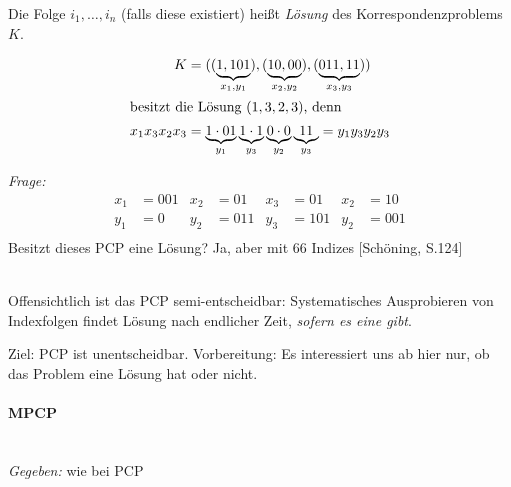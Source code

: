 Die Folge $i_1, \dots, i_n$ (falls diese existiert) heißt \emph{Lösung} des Korrespondenzproblems $K$.
\begin{Bsp*}
\begin{align*}
	K &=((\underbrace{1,101}_{x_1, y_1}), (\underbrace{10, 00}_{x_2, y_2}), (\underbrace{011, 11}_{x_3, y_3}))\\
\shortintertext{besitzt die Lösung $(1,3,2,3)$, denn}
	x_1 x_3 x_2 x_3 &= \underbrace{1 \cdot 01}_{y_1}\underbrace{1 \cdot 1}_{y_3}\underbrace{0 \cdot 0}_{y_2}\underbrace{11}_{y_3} = y_1 y_3 y_2 y_3
\end{align*}
\end{Bsp*}\vspace{-1em}
\emph{Frage:}
\begin{align*}
  x_1&=001 & x_2&=01 & x_3&=01 & x_2&=10\\
  y_1&=0  & y_2&=011 & y_3&=101  & y_2&=001\\
\end{align*}
Besitzt dieses \ac{PCP} eine Lösung? Ja, aber mit $66$ Indizes [Schöning, S.124]
\begin{Bemerkung}\ \\
  Offensichtlich ist das \ac{PCP} semi-entscheidbar: Systematisches
  Ausprobieren von Indexfolgen findet Lösung nach endlicher Zeit,
  \emph{sofern es eine gibt}.
\end{Bemerkung}
Ziel: \ac{PCP} ist unentscheidbar. Vorbereitung:
Es interessiert uns ab hier nur, ob das Problem eine Lösung hat oder nicht.
\paragraph[\acf*{MPCP}]{\acf{MPCP}}\ \\
\emph{Gegeben:} wie bei \ac{PCP}

